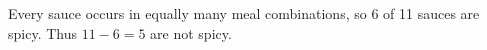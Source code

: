 Every sauce occurs in equally many meal combinations, so 6 of 11 sauces are spicy. Thus $11-6=\boxed5$ are not spicy.
